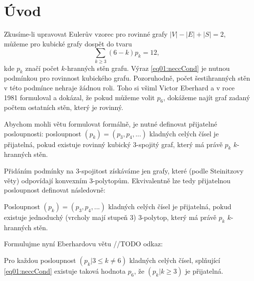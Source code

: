 \chapter*{Úvod}

Zkusíme-li upravovat Eulerův vzorec pro rovinné grafy
$|V|-|E|+|S|=2$, můžeme pro kubické grafy dospět do tvaru 
\begin{equation}\label{eq01:neccCond}
\sum_{k \geq 3}{(6-k)p_k}=12,
\end{equation}
kde $p_k$ značí počet $k$-hranných stěn grafu. Výraz \eqref{eq01:neccCond} je nutnou podmínkou pro rovinnost kubického grafu. Pozoruhodně, počet šestihranných stěn v této podmínce nehraje žádnou roli. Toho si všiml Victor Eberhard a v roce 1981 formuloval a dokázal, že pokud můžeme volit $p_6$, dokážeme najít graf zadaný počtem ostatních stěn, který je rovinný.

Abychom mohli větu formulovat formálně, je nutné definovat přijatelné posloupnosti: posloupnost $(p_k) = (p_3,p_4,...)$ kladných celých čísel je přijatelná, pokud existuje rovinný kubický 3-spojitý graf, který má právě $p_k$ $k$-hranných stěn.

Přidáním podmínky na 3-spojitost získáváme jen grafy, které (podle Steinitzovy věty) odpovídají konvexním 3-polytopům. Ekvivalentně lze tedy přijatelnou posloupnost definovat následovně:

\begin{definice}\label{def01:1}
Posloupnost $(p_k) = (p_3,p_4,...)$ kladných celých čísel je přijatelná, pokud existuje jednoduchý (vrcholy mají stupeň 3) 3-polytop, který má právě $p_k$ $k$-hranných stěn.
\end{definice}

Formulujme nyní Eberhardovu větu //TODO odkaz:
\begin{veta}\label{veta01:1}
Pro každou posloupnost $(p_k | 3 \leq k \neq 6)$ kladných celých čísel, splňující \eqref{eq01:neccCond} existuje taková hodnota $p_6$, že $(p_k | k\geq 3)$ je přijatelná.
\end{veta}
